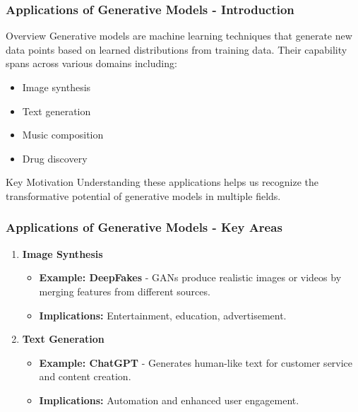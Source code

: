 \documentclass[aspectratio=169]{beamer}
\begin{document}
\begin{frame}[fragile]
    \frametitle{Applications of Generative Models - Introduction}
    \begin{block}{Overview}
        Generative models are machine learning techniques that generate new data points based on learned distributions from training data. Their capability spans across various domains including:
        \begin{itemize}
            \item Image synthesis
            \item Text generation
            \item Music composition
            \item Drug discovery
        \end{itemize}
    \end{block}
    \begin{block}{Key Motivation}
        Understanding these applications helps us recognize the transformative potential of generative models in multiple fields.
    \end{block}
\end{frame}

\begin{frame}[fragile]
    \frametitle{Applications of Generative Models - Key Areas}
    \begin{enumerate}
        \item \textbf{Image Synthesis}
            \begin{itemize}
                \item \textbf{Example: DeepFakes} - GANs produce realistic images or videos by merging features from different sources.
                \item \textbf{Implications:} Entertainment, education, advertisement.
            \end{itemize}

        \item \textbf{Text Generation}
            \begin{itemize}
                \item \textbf{Example: ChatGPT} - Generates human-like text for customer service and content creation.
                \item \textbf{Implications:} Automation and enhanced user engagement.
            \end{itemize}
    \end{enumerate}
\end{frame}
\end{document}
